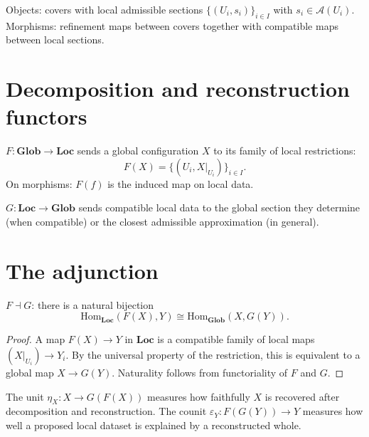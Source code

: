\begin{definition}
  \label{def:loc}
  Objects: covers with local admissible sections
  $\{(U_i, s_i)\}_{i \in I}$ with $s_i \in \mathcal{A}(U_i)$.
  Morphisms: refinement maps between covers together with
  compatible maps between local sections.
\end{definition}

\section{Decomposition and reconstruction functors}

\begin{definition}
  \label{def:decomp-functor}
  $F : \mathbf{Glob} \to \mathbf{Loc}$ sends a global
  configuration $X$ to its family of local restrictions:
  \[
    F(X) = \{(U_i, X|_{U_i})\}_{i \in I}.
  \]
  On morphisms: $F(f)$ is the induced map on local data.
\end{definition}

\begin{definition}
  \label{def:recon-functor}
  $G : \mathbf{Loc} \to \mathbf{Glob}$ sends compatible local
  data to the global section they determine (when compatible)
  or the closest admissible approximation (in general).
\end{definition}

\section{The adjunction}

\begin{theorem}
  \label{thm:adjunction}
  \statusproven{}
  $F \dashv G$: there is a natural bijection
  \[
    \mathrm{Hom}_{\mathbf{Loc}}(F(X), Y)
    \cong
    \mathrm{Hom}_{\mathbf{Glob}}(X, G(Y)).
  \]
\end{theorem}

\begin{proof}
  A map $F(X) \to Y$ in $\mathbf{Loc}$ is a compatible family
  of local maps $(X|_{U_i}) \to Y_i$.
  By the universal property of the restriction, this is
  equivalent to a global map $X \to G(Y)$.
  Naturality follows from functoriality of $F$ and $G$.
\end{proof}

\begin{definition}
  The unit $\eta_X : X \to G(F(X))$ measures how faithfully
  $X$ is recovered after decomposition and reconstruction.
  The counit $\varepsilon_Y : F(G(Y)) \to Y$ measures how well
  a proposed local dataset is explained by a reconstructed whole.
\end{definition}

